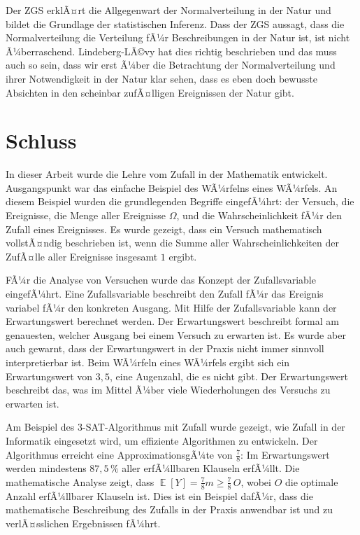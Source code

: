 ﻿\documentclass[12pt,a4paper]{article}
\theoremstyle{definition}
\theoremstyle{plain}
\theoremstyle{remark}
\DeclareMathOperator{\E}{\mathbb{E}}
\begin{document}
Der ZGS erklÃ¤rt die Allgegenwart der Normalverteilung in der Natur und bildet die Grundlage der statistischen Inferenz. Dass der ZGS aussagt, dass die Normalverteilung die Verteilung fÃ¼r Beschreibungen in der Natur ist, ist nicht Ã¼berraschend. Lindeberg-LÃ©vy hat dies richtig beschrieben und das muss auch so sein, dass wir erst Ã¼ber die Betrachtung der Normalverteilung und ihrer Notwendigkeit in der Natur klar sehen, dass es eben doch bewusste Absichten in den scheinbar zufÃ¤lligen Ereignissen der Natur gibt.

\section{Schluss}
\label{sec:schluss}

In dieser Arbeit wurde die Lehre vom Zufall in der Mathematik entwickelt.
Ausgangspunkt war das einfache Beispiel des WÃ¼rfelns eines WÃ¼rfels. An diesem
Beispiel wurden die grundlegenden Begriffe eingefÃ¼hrt: der Versuch, die
Ereignisse, die Menge aller Ereignisse $\Omega$, und die Wahrscheinlichkeit
fÃ¼r den Zufall eines Ereignisses. Es wurde gezeigt, dass ein Versuch
mathematisch vollstÃ¤ndig beschrieben ist, wenn die Summe aller
Wahrscheinlichkeiten der ZufÃ¤lle aller Ereignisse insgesamt $1$ ergibt.

FÃ¼r die Analyse von Versuchen wurde das Konzept der Zufallsvariable
eingefÃ¼hrt. Eine Zufallsvariable beschreibt den Zufall fÃ¼r das Ereignis
variabel fÃ¼r den konkreten Ausgang. Mit Hilfe der Zufallsvariable kann der
Erwartungswert berechnet werden. Der Erwartungswert beschreibt formal am
genauesten, welcher Ausgang bei einem Versuch zu erwarten ist. Es wurde aber
auch gewarnt, dass der Erwartungswert in der Praxis nicht immer sinnvoll
interpretierbar ist. Beim WÃ¼rfeln eines WÃ¼rfels ergibt sich ein
Erwartungswert von $3{,}5$, eine Augenzahl, die es nicht gibt. Der
Erwartungswert beschreibt das, was im Mittel Ã¼ber viele Wiederholungen des
Versuchs zu erwarten ist.

Am Beispiel des 3-SAT-Algorithmus mit Zufall wurde gezeigt, wie Zufall in
der Informatik eingesetzt wird, um effiziente Algorithmen zu entwickeln. Der
Algorithmus erreicht eine ApproximationsgÃ¼te von $\frac{7}{8}$: Im
Erwartungswert werden mindestens $87{,}5\,\%$ aller erfÃ¼llbaren Klauseln
erfÃ¼llt. Die mathematische Analyse zeigt, dass
$\E[Y] = \frac{7}{8}m \ge \frac{7}{8}\,O$, wobei $O$ die optimale Anzahl
erfÃ¼llbarer Klauseln ist. Dies ist ein Beispiel dafÃ¼r, dass die
mathematische Beschreibung des Zufalls in der Praxis anwendbar ist und zu
verlÃ¤sslichen Ergebnissen fÃ¼hrt.
\end{document}
